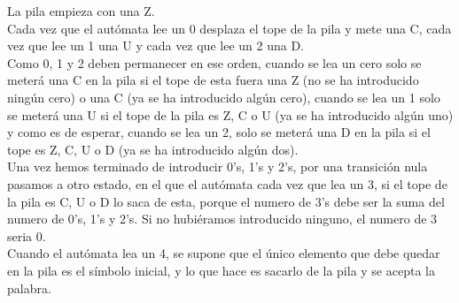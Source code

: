 \documentclass[12pt, spanish]{article}
\begin{document}
\begin{right}
\end{right}

La pila empieza con una Z.\\
Cada vez que el autómata lee un 0 desplaza el tope de la pila y mete una C, cada vez que lee un 1 una U y cada vez que lee un 2 una D. \\
Como 0, 1 y 2 deben permanecer en ese orden, cuando se lea un cero solo se meterá una C en la pila si el tope de esta fuera una Z (no se ha introducido ningún cero) o una C (ya se ha introducido algún cero), cuando se lea un 1 solo se meterá una U si el tope de la pila es Z, C o U (ya se ha introducido algún uno) y como es de esperar, cuando se lea un 2, solo se meterá una D en la pila si el tope es Z, C, U o D (ya se ha introducido algún dos).\\
Una vez hemos terminado de introducir 0's, 1's y 2's, por una transición nula pasamos a otro estado, en el que el autómata cada vez que lea un 3, si el tope de la pila es C, U o D lo saca de esta, porque el numero de 3's debe ser la suma del numero de 0's, 1's y 2's. Si no hubiéramos introducido ninguno, el numero de 3 seria 0.\\
Cuando el autómata lea un 4, se supone que el único elemento que debe quedar en la pila es el símbolo inicial, y lo que hace es sacarlo de la pila y se acepta la palabra.
\end{document}
